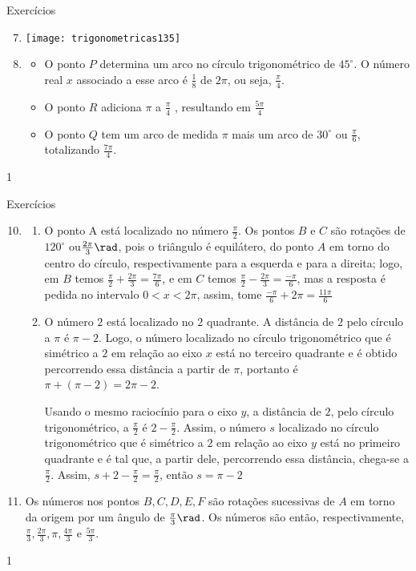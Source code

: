 \begin{answer}{Exercícios}
{\exerciselist
\begin{enumerate}\setcounter{enumi}{6}
\item {}
{
\texttt{[image: trigonometricas135]}
}
\item 
\begin{itemize}
\item O ponto $P$ determina um arco no círculo trigonométrico de $45^{\circ}$. O número real $x$ associado a esse arco é $\frac{1}{8}$ de $2\pi$, ou seja, $\frac{\pi}{4}$.
\item O ponto $R$ adiciona $\pi$ a $\frac{\pi}{4}$ , resultando em $\frac{5\pi}{4}$
\item O ponto $Q$ tem um arco de medida $\pi$ mais um arco de $30^{\circ}$ ou $\frac{\pi}{6}$, totalizando $\frac{7\pi}{4}$.
\end{itemize}
\end{enumerate}
}{1}
\end{answer}
\clearmargin
\begin{answer}{Exercícios}
{\exerciselist
\begin{enumerate}\setcounter{enumi}{9}
\item 
\begin{enumerate}
\item O ponto A está localizado no número $\frac{\pi}{2}$. Os pontos $B$ e $C$ são rotações de $120^{\circ}$ ou$\frac{2\pi}{3}\rad$, pois o triângulo é equilátero, do ponto $A$ em torno do centro do círculo, respectivamente para a esquerda e para a direita; logo, em $B$ temos $\frac{\pi}{2}+\frac{2\pi}{3}=\frac{7\pi}{6}$, e em $C$ temos $\frac{\pi}{2}-\frac{2\pi}{3}=\frac{-\pi}{6}$, mas a resposta é pedida no intervalo 0$<x<2\pi$, assim, tome $\frac{-\pi}{6}+2\pi=\frac{11\pi}{6}$

\item O número $2$ está localizado no $2$ quadrante. A distância de $2$ pelo círculo a $\pi$ é $\pi-2$. Logo, o número localizado no círculo trigonométrico que é simétrico a $2$ em relação ao eixo $x$ está no terceiro quadrante e é obtido percorrendo essa distância a partir de $\pi$, portanto é $\pi+(\pi-2)=2\pi-2$.

Usando o mesmo raciocínio para o eixo $y$, a distância de $2$, pelo círculo trigonométrico, a $\frac{\pi}{2}$ é $2-\frac{\pi}{2}$. Assim, o número $s$ localizado no círculo trigonométrico que é simétrico a $2$ em relação ao eixo $y$ está no primeiro quadrante e é tal que, a partir dele, percorrendo essa distância, chega-se a $\frac{\pi}{2}$. Assim, $s+2-\frac{\pi}{2}=\frac{\pi}{2}$, então $s=\pi-2$
\end{enumerate}
\item Os números nos pontos $B, C, D, E, F$ são rotações sucessivas de $A$ em torno da origem por um ângulo de $\frac{\pi}{3}\rad$. Os números são então, respectivamente, $\frac{\pi}{3},\frac{2\pi}{3},\pi,\frac{4\pi}{3}$ e $\frac{5\pi}{3}$.
\end{enumerate}
}{1}
\end{answer}

